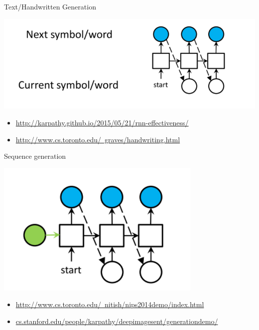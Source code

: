 \documentclass{beamer}
\begin{document}
\begin{frame}{Text/Handwritten Generation}
		\begin{center}
			\includegraphics[scale=0.4]{./img/textgen}
		\end{center}
	
	\begin{itemize}
	\item \href{http://karpathy.github.io/2015/05/21/rnn-effectiveness/}{http://karpathy.github.io/2015/05/21/rnn-effectiveness/}
		
	\item \href{http://www.cs.toronto.edu/~graves/handwriting.html}{http://www.cs.toronto.edu/~graves/handwriting.html}
		
	\end{itemize}
\end{frame}

\begin{frame}{Sequence generation}
	\begin{center}
		\includegraphics[scale=0.4]{./img/ic}
	\end{center}
	
	\begin{itemize}
		\item\href{http://www.cs.toronto.edu/~nitish/nips2014demo/index.html}{http://www.cs.toronto.edu/~nitish/nips2014demo/index.html}
		
		\item \href{http://cs.stanford.edu/people/karpathy/deepimagesent/generationdemo/}{cs.stanford.edu/people/karpathy/deepimagesent/generationdemo/}
		
	\end{itemize}
\end{frame}
\end{document}

